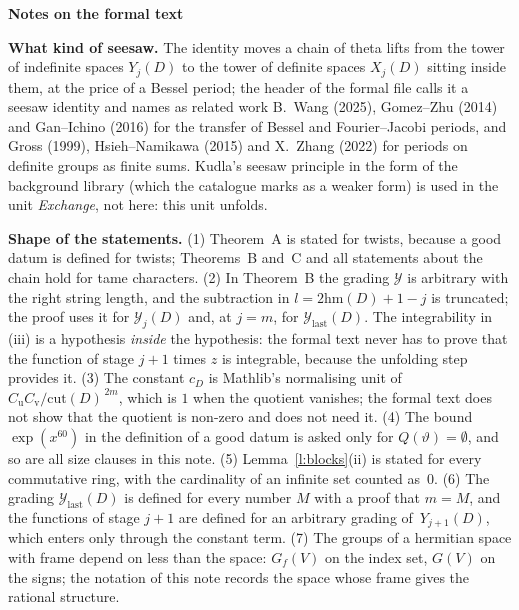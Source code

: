 \documentclass[11pt,a4paper]{article}
\newcommand{\m}[1]{\mbox{$#1$}}        %
\newcommand{\sect}[2]{\refstepcounter{section}\label{#2}\par\addvspace{19pt plus 4pt minus 2pt}\Needspace{7\baselineskip}%
  \noindent\llap{{\fontsize{13.2}{16}\selectfont\bfseries\color{inkfaint}\thesection}\hspace{9pt}}%
  {\fontsize{13.2}{16}\selectfont\bfseries\color{ink}#1}\par\nopagebreak\vspace{-1pt}}
\newcommand{\subhead}[1]{\par\addvspace{9pt plus 2pt}\Needspace{4\baselineskip}\noindent\textbf{#1}\enspace\ignorespaces}
\theoremstyle{plainx}
\theoremstyle{uprightx}
\newcommand{\rhoD}[1]{\mathrm{hm}(#1)}                 %
\newcommand{\Xs}[2]{X_{#2}(#1)}                    %
\newcommand{\Ys}[2]{Y_{#2}(#1)}                    %
\newcommand{\Qs}[1]{Q(#1)}                         %
\newcommand{\gY}[1]{\mathcal{Y}_{#1}(D)}           %
\newcommand{\gYlast}{\mathcal{Y}_{\mathrm{last}}(D)}
\newcommand{\cutB}{\mathrm{cut}(D)}                %
\newcommand{\cD}[1]{c_{#1}}                         %
\begin{document}
\sect{Notes on the formal text}{s:notes}

\subhead{What kind of seesaw.} The identity moves a chain of theta lifts from the tower of indefinite spaces
$\Ys{D}{j}$ to the tower of definite spaces $\Xs{D}{j}$ sitting inside them, at the price of a Bessel period; the
header of the formal file calls it a seesaw identity and names as related work B.~Wang (2025), Gomez--Zhu (2014)
and Gan--Ichino (2016) for the transfer of Bessel and Fourier--Jacobi periods, and Gross (1999), Hsieh--Namikawa
(2015) and X.~Zhang (2022) for periods on definite groups as finite sums. Kudla's seesaw principle in the
form of the background library (which the catalogue marks as a weaker form) is used in the unit \emph{Exchange}, not
here: this unit unfolds.

\subhead{Shape of the statements.} (1) Theorem~A is stated for twists, because a good datum is defined for twists;
Theorems~B and~C and all statements about the chain hold for tame characters. (2) In Theorem~B the grading
$\mathcal{Y}$ is arbitrary with the right string length, and the subtraction in \m{l=2\rhoD{D}+1-j} is truncated; the
proof uses it for $\gY{j}$ and, at \m{j=m}, for $\gYlast$. The integrability in (iii) is a hypothesis \emph{inside}
the hypothesis: the formal text never has to prove that the function of stage \m{j+1} times $z$ is integrable,
because the unfolding step provides it. (3) The constant $\cD{D}$ is Mathlib's normalising unit of
\m{C_{\mathrm{u}}C_{\mathrm{v}}/\cutB^{\,2m}}, which is $1$ when the quotient vanishes; the formal text does not show
that the quotient is non-zero and does not need it. (4) The bound \m{\exp(x^{60})} in the definition of a good
datum is asked only for \m{\Qs{\vartheta}=\emptyset}, and so are all size clauses in this note. (5)
Lemma~\ref{l:blocks}(ii) is stated for every commutative ring, with the cardinality of an infinite set counted
as~$0$. (6) The grading $\gYlast$ is defined for every number $M$ with a proof that \m{m=M}, and the functions of
stage \m{j+1} are defined for an arbitrary grading of~$\Ys{D}{j+1}$, which enters only through the constant term.
(7) The groups of a hermitian space with frame depend on less than the space: $G_f(V)$ on the index set, $G(V)$ on
the signs; the notation of this note records the space whose frame gives the rational structure.
\end{document}
